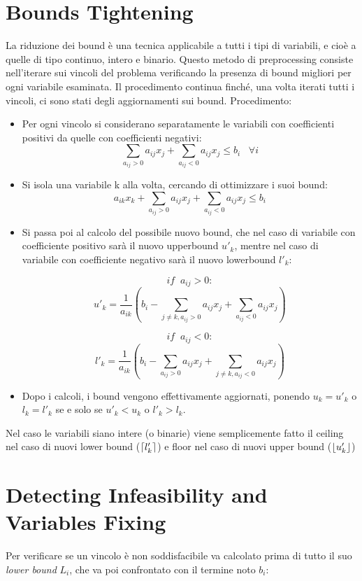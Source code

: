 \documentclass{article}
\DeclarePairedDelimiter{\ceil}{\lceil}{\rceil}
\DeclarePairedDelimiter\floor{\lfloor}{\rfloor}
\begin{document}
\section{Bounds Tightening}

La riduzione dei bound è una tecnica applicabile a tutti i tipi di variabili, e cioè a quelle di tipo continuo, intero e binario.
\newline
\newline
Questo metodo di preprocessing consiste nell'iterare sui vincoli del problema verificando la presenza di bound migliori per ogni variabile esaminata. Il procedimento continua finché, una volta iterati tutti i vincoli, ci sono stati degli aggiornamenti sui bound.
\newline
\newline
Procedimento:
\begin{itemize}
\item Per ogni vincolo si considerano separatamente le variabili con coefficienti positivi da quelle con coefficienti negativi:
\[
\sum_{a_{ij}>0}a_{ij} x_{j} + \sum_{a_{ij}<0}a_{ij} x_{j} \le b_i  \;\;\;\forall i
\] 
\item Si isola una variabile k alla volta, cercando di ottimizzare i suoi bound:
\[
a_{ik} x_{k} + \sum_{a_{ij}>0}a_{ij} x_{j} + \sum_{a_{ij}<0}a_{ij} x_{j} \le b_i
\]
\item Si passa poi al calcolo del possibile nuovo bound, che nel caso di variabile con coefficiente positivo sarà il nuovo upperbound $u'_k$, mentre nel caso di variabile con coefficiente negativo sarà il nuovo lowerbound $l'_k$:

\[
if\;\;a_{ij}>0:\]
\[
u'_k = \frac{1}{a_{ik}}\left(b_i - \sum_{j\ne k,a_{ij}>0}a_{ij} x_{j} + \sum_{a_{ij}<0}a_{ij} x_{j}\right)
\]

\[
if\;\;a_{ij}<0:\]
\[
l'_k = \frac{1}{a_{ik}}\left(b_i - \sum_{a_{ij}>0}a_{ij} x_{j} + \sum_{j\ne k,a_{ij}<0}a_{ij} x_{j}\right)
\]
\item Dopo i calcoli, i bound vengono effettivamente aggiornati, ponendo $u_k = u'_k$ o $l_k=l'_k$ se e solo se $u'_k<u_k$ o $l'_k>l_k$.
\end{itemize}

Nel caso le variabili siano intere (o binarie) viene semplicemente fatto il ceiling nel caso di nuovi lower bound ($\ceil*{l'_k}$) e floor nel caso di nuovi upper bound ($\floor*{u'_k}$)
\section{Detecting Infeasibility and Variables Fixing}
Per verificare se un vincolo è non soddisfacibile va calcolato prima di tutto il suo \textit{lower bound} $L_i$, che va poi confrontato con il termine noto $b_i$:
\end{document}
